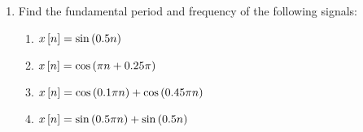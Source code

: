 \documentclass[12pt]{article}
\def\lp{\ensuremath\left(}
\def\rp{\ensuremath\right)}
\def\ls{\ensuremath\left[}
\def\rs{\ensuremath\right]}
\begin{document}
\begin{enumerate}
    \item Find the fundamental period and frequency of the following signals:
    \begin{enumerate}
        \item $x\ls n \rs = \sin\lp 0.5n\rp$ \vspace{3cm}
        \item $x\ls n \rs = \cos\lp \pi n + 0.25\pi\rp$ \vspace{3cm}
        \item $x\ls n \rs = \cos\lp 0.1\pi n\rp + \cos\lp 0.45\pi n\rp$ \vspace{3cm}
        \item $x\ls n \rs = \sin\lp 0.5\pi n\rp + \sin\lp 0.5n \rp$ \vspace{3cm}
    \end{enumerate}
\end{enumerate}
\end{document}
